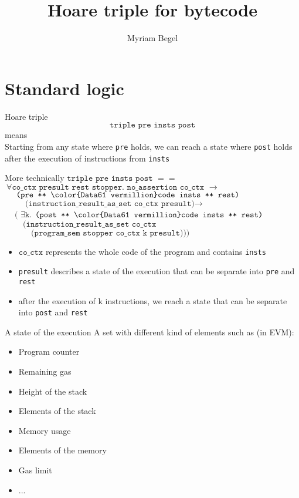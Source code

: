 \documentclass{beamer}
\title{Hoare triple for bytecode}
\author{Myriam Begel}
\begin{document}
\maketitle

\part{Standard logic}
\frame{\partpage}
\begin{frame}{Hoare triple}
	\[\texttt{triple pre insts post}\]
	means\\
	{\color{Data61 green}Starting from any state where \texttt{pre} holds}, {\color{Data61 plum}we can reach a state where \texttt{post} holds} {\color{Data61 vermillion}after the execution of instructions from \texttt{insts}}
\end{frame}

\begin{frame}{More technically}
	$\texttt{triple}\texttt{ pre insts post }==$\\
	$~\forall \texttt{co\_ctx presult rest stopper. no\_assertion co\_ctx }\rightarrow$\\
	\color{Data61 green}
	$~\quad\texttt{(pre ** {\color{Data61 vermillion}code insts} ** rest)}$\\
	$~\qquad\texttt{(instruction\_result\_as\_set co\_ctx presult)} \rightarrow$\\
	\color{Data61 plum}
	$~\quad($
	{$\exists \texttt{k.}$}
	$\texttt{(post ** {\color{Data61 vermillion}code insts} ** rest)}$\\
	$~\qquad\texttt{(instruction\_result\_as\_set co\_ctx}$\\
	{$~\qquad\quad\texttt{(program\_sem stopper co\_ctx k presult)))}$}\\
	\begin{itemize}
		\item $\texttt{co\_ctx}$ represents the whole code of the program and contains \texttt{insts}
		\item \texttt{presult} describes a state of the execution that can be separate into \texttt{pre} and \texttt{rest}
		\item after the execution of k instructions, we reach a state that can be separate into \texttt{post} and \texttt{rest}
	\end{itemize}		
\end{frame}

\begin{frame}{A state of the execution}
	A set with different kind of elements such as (in EVM):
	\begin{itemize}
		\item Program counter
		\item Remaining gas
		\item Height of the stack
		\item Elements of the stack
		\item Memory usage
		\item Elements of the memory
		\item Gas limit
		\item ...
	\end{itemize}
\end{frame}
\end{document}
